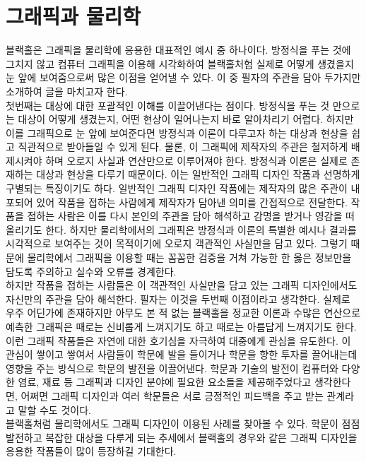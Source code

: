\documentclass[
    aps,
    reprint,
    superscriptaddress,
    ]{revtex4-2}
\begin{document}
\section{그래픽과 물리학}
블랙홀은 그래픽을 물리학에 응용한 대표적인 예시 중 하나이다. 방정식을 푸는 것에 그치지 않고
컴퓨터 그래픽을 이용해 시각화하여 블랙홀처험 실제로 어떻게 생겼을지 눈 앞에 보여줌으로써
많은 이점을 얻어낼 수 있다. 이 중 필자의 주관을 담아 두가지만 소개하여 글을 마치고자 한다.\\
첫번째는 대상에 대한 포괄적인 이해를 이끌어낸다는 점이다.
방정식을 푸는 것 만으로는 대상이 어떻게 생겼는지, 어떤 현상이 일어나는지 바로 알아차리기 어렵다.
하지만 이를 그래픽으로 눈 앞에 보여준다면 방정식과 이론이 다루고자 하는 대상과 현상을
쉽고 직관적으로 받아들일 수 있게 된다. 물론, 이 그래픽에 제작자의 주관은 철저하게 배제시켜야 하며
오로지 사실과 연산만으로 이루어져야 한다. 방정식과 이론은 실제로 존재하는 대상과 현상을 다루기
때문이다. 이는 일반적인 그래픽 디자인 작품과 선명하게 구별되는 특징이기도 하다. 일반적인 그래픽
디자인 작품에는 제작자의 많은 주관이 내포되어 있어 작품을 접하는 사람에게 제작자가 담아낸 의미를 
간접적으로 전달한다. 작품을 접하는 사람은 이를 다시 본인의 주관을 담아 해석하고 감명을 받거나
영감을 떠올리기도 한다. 하지만 물리학에서의 그래픽은 방정식과 이론의 특별한 예시나 결과를 
시각적으로 보여주는 것이 목적이기에 오로지 객관적인 사실만을 담고 있다.
그렇기 때문에 물리학에서 그래픽을 이용할 때는 꼼꼼한 검증을 거쳐 가능한 한 옳은 정보만을 
담도록 주의하고 실수와 오류를 경계한다. \\
하지만 작품을 접하는 사람들은 이 객관적인 사실만을 담고 있는 그래픽 디자인에서도 자신만의 주관을
담아 해석한다. 필자는 이것을 두번째 이점이라고 생각한다. 실제로 우주 어딘가에 존재하지만 아무도
본 적 없는 블랙홀을 정교한 이론과 수많은 연산으로 예측한 그래픽은 때로는 신비롭게 느껴지기도 하고
때로는 아름답게 느껴지기도 한다. 이런 그래픽 작품들은 자연에 대한 호기심을 자극하여 대중에게 
관심을 유도한다. 이 관심이 쌓이고 쌓여서 사람들이 학문에 발을 들이거나 학문을 향한 투자를 
끌어내는데 영향을 주는 방식으로 학문의 발전을 이끌어낸다. 학문과 기술의 발전이 컴퓨터와 다양한
염료, 재료 등 그래픽과 디자인 분야에 필요한 요소들을 제공해주었다고 생각한다면, 어쩌면 그래픽 
디자인과 여러 학문들은 서로 긍정적인 피드백을 주고 받는 관계라고 말할 수도 것이다. \\
블랙홀처럼 물리학에서도 그래픽 디자인이 이용된 사례를 찾아볼 수 있다. 학문이 점점 발전하고
복잡한 대상을 다루게 되는 추세에서 블랙홀의 경우와 같은 그래픽 디자인을 응용한 작품들이 많이
등장하길 기대한다.
\end{document}
